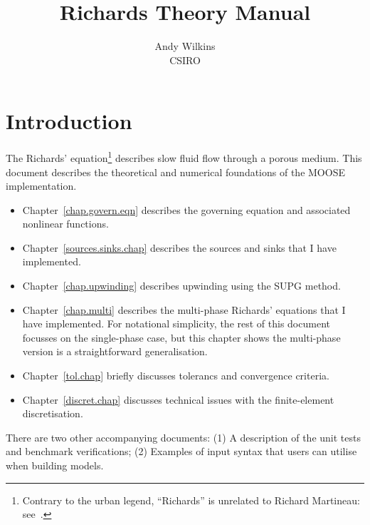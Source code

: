 \documentclass[]{scrreprt}
\begin{document}
\title{Richards Theory Manual}
\author{Andy Wilkins \\
CSIRO}
\maketitle

\tableofcontents

\chapter{Introduction}

The Richards' equation\footnote{Contrary to the urban legend,
  ``Richards'' is unrelated to Richard Martineau:
  see~\cite{richards1931}.} describes slow fluid flow through a porous
medium.  This document describes the theoretical and numerical
foundations of the MOOSE implementation.
\begin{itemize}
\item Chapter~\ref{chap.govern.eqn} describes the governing equation
  and associated nonlinear functions.
\item Chapter~\ref{sources.sinks.chap} describes the sources and sinks
  that I have implemented.
\item Chapter~\ref{chap.upwinding} describes upwinding using the SUPG method.
\item Chapter~\ref{chap.multi} describes the multi-phase Richards'
  equations that I have implemented.  For notational simplicity, the
  rest of this document focusses on the single-phase case, but this
  chapter shows the multi-phase version is a straightforward
  generalisation.
\item Chapter~\ref{tol.chap} briefly discusses tolerancs and
  convergence criteria.
\item Chapter~\ref{discret.chap} discusses technical issues with the
  finite-element discretisation.
\end{itemize}
There are two other accompanying documents: (1) A description of the
unit tests and benchmark verifications; (2) Examples of input syntax
that users can utilise when building models.

\end{document}
